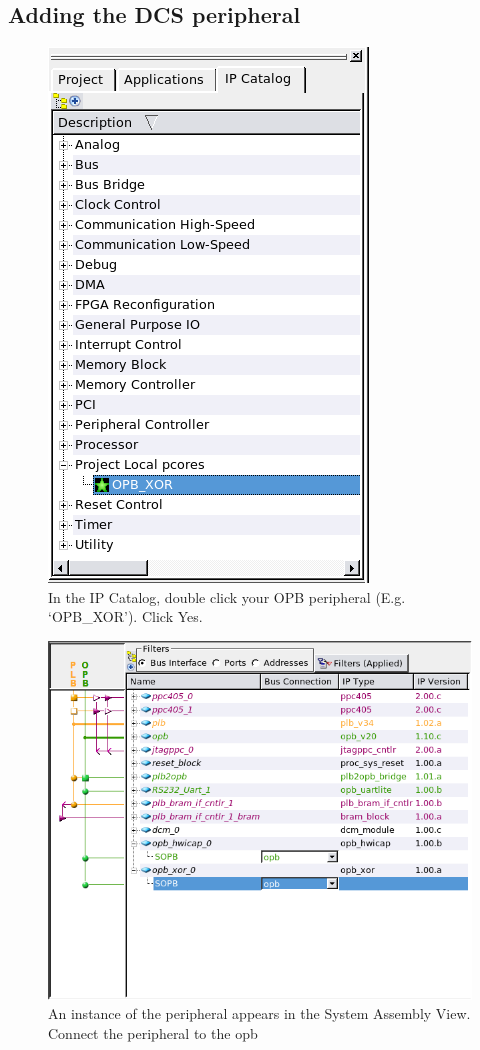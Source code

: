 \documentclass[a4paper,oneside]{memoir}
\begin{document}
\subsection{Adding the DCS peripheral}\label{sec:adding_peripheral}
\begin{figure}[H]
\centering
\includegraphics[scale=0.5]{AXOR1}
\caption{In the IP Catalog, double click your OPB peripheral (E.g. `OPB\_XOR'). Click Yes.\label{fig:AXOR1}}
\end{figure}
\begin{figure}[H]
\centering
\includegraphics[scale=0.5]{AXOR2}
\caption{An instance of the peripheral appears in the System Assembly View. Connect the peripheral to the opb\label{fig:AXOR2}}
\end{figure}
\end{document}
